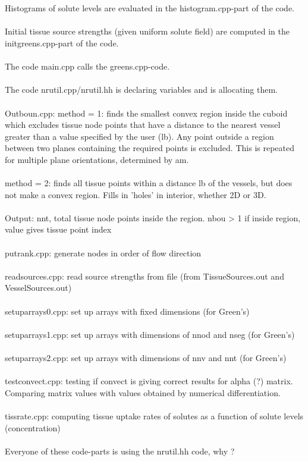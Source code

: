 \\
\\Histograms of solute levels are evaluated in the histogram.cpp-part of the code.
\\
\\Initial tissue source strengths (given uniform solute field) are computed in the initgreens.cpp-part of the code.
\\
\\The code main.cpp calls the greens.cpp-code.
\\
\\The code nrutil.cpp/nrutil.hh is declaring variables and is allocating them.
\\
\\Outboun.cpp: method = 1: finds the smallest convex region inside the cuboid
which excludes tissue node points that have a distance to the nearest
vessel greater than a value specified by the user (lb).  Any point
outside a region between two planes containing the required points is
excluded.  This is repeated for multiple plane orientations, determined by am.
\\
\\method = 2: finds all tissue points within a distance lb of the vessels, but
does not make a convex region.  Fills in 'holes' in interior, whether 2D or 3D.
\\
\\Output:	nnt, total tissue node points inside the region.
nbou > 1 if inside region, value gives tissue point index
\\
\\putrank.cpp: generate nodes in order of flow direction
\\
\\readsources.cpp: read source strengths from file (from TissueSources.out and VesselSources.out)
\\
\\setuparrays0.cpp: set up arrays with fixed dimensions (for Green's)
\\
\\setuparrays1.cpp: set up arrays with dimensions of nnod and nseg (for Green's)
\\
\\setuparrays2.cpp: set up arrays with dimensions of nnv and nnt (for Green's)
\\
\\testconvect.cpp: testing if convect is giving correct results for alpha (?) matrix. Comparing matrix values with values obtained by numerical differentiation.
\\
\\tissrate.cpp: computing tissue uptake rates of solutes as a function of solute levels (concentration)
\\
\\Everyone of these code-parts is using the nrutil.hh code, why ?

